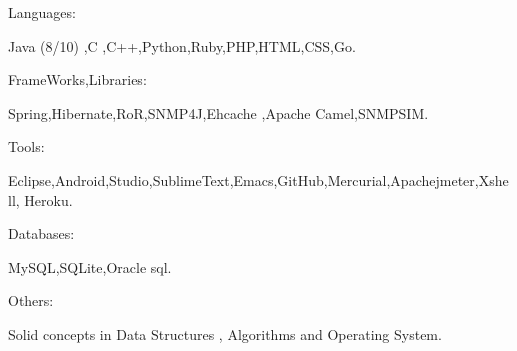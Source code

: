 \begin{cventries}
  \cventry
    {}
    {Languages:}
    {}
    {}
    {
      \begin{cvitems}
        \item {Java (8/10) ,C ,C++,Python,Ruby,PHP,HTML,CSS,Go.}
      \end{cvitems}
    }
  \cventry
    {}
    {FrameWorks,Libraries:}
    {}
    {}
    {
      \begin{cvitems}
        \item {Spring,Hibernate,RoR,SNMP4J,Ehcache ,Apache Camel,SNMPSIM.}
      \end{cvitems}
    }
  \cventry
    {}
    {Tools:}
    {}
    {}
    {
      \begin{cvitems}
        \item {Eclipse,Android,Studio,SublimeText,Emacs,GitHub,Mercurial,Apachejmeter,Xshell,
Heroku.}
      \end{cvitems}
    }
 \cventry
    {}
    {Databases:}
    {}
    {}
    {
      \begin{cvitems}
        \item {MySQL,SQLite,Oracle sql.}
      \end{cvitems}
    }
     \cventry
    {}
    {Others:}
    {}
    {}
    {
      \begin{cvitems}
        \item {Solid concepts in Data Structures , Algorithms and Operating System.}
      \end{cvitems}
    }
\end{cventries}
